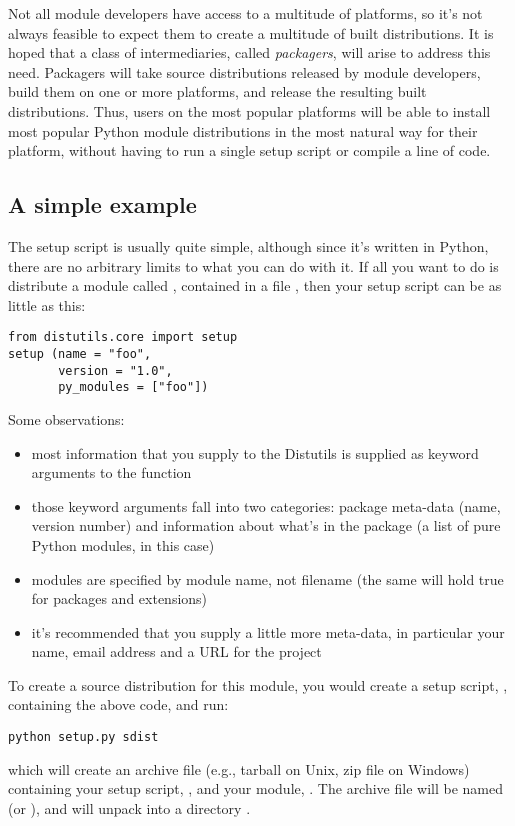 \documentclass{howto}
\begin{document}
Not all module developers have access to a multitude of platforms, so
it's not always feasible to expect them to create a multitude of built
distributions.  It is hoped that a class of intermediaries, called
\emph{packagers}, will arise to address this need.  Packagers will take
source distributions released by module developers, build them on one or
more platforms, and release the resulting built distributions.  Thus,
users on the most popular platforms will be able to install most popular
Python module distributions in the most natural way for their platform,
without having to run a single setup script or compile a line of code.


\subsection{A simple example}
\label{simple-example}

The setup script is usually quite simple, although since it's written in
Python, there are no arbitrary limits to what you can do with it.  If
all you want to do is distribute a module called , contained
in a file , then your setup script can be as little as
this:
\begin{verbatim}
from distutils.core import setup
setup (name = "foo",
       version = "1.0",
       py_modules = ["foo"])
\end{verbatim}

Some observations:
\begin{itemize}
\item most information that you supply to the Distutils is supplied as
  keyword arguments to the  function
\item those keyword arguments fall into two categories: package
  meta-data (name, version number) and information about what's in the
  package (a list of pure Python modules, in this case)
\item modules are specified by module name, not filename (the same will
  hold true for packages and extensions)
\item it's recommended that you supply a little more meta-data, in
  particular your name, email address and a URL for the project
\end{itemize}

To create a source distribution for this module, you would create a
setup script, , containing the above code, and run:
\begin{verbatim}
python setup.py sdist
\end{verbatim}
which will create an archive file (e.g., tarball on Unix, zip file on
Windows) containing your setup script, , and your module,
.  The archive file will be named  (or
), and will unpack into a directory .
\end{document}
